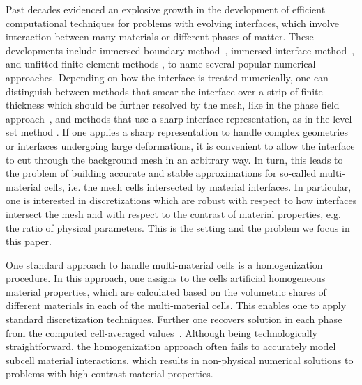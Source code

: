 \documentclass[12pt]{article}
\begin{document}
	Past decades evidenced an explosive {\color{blue}growth in the development of efficient computational techniques} for problems with evolving interfaces, which involve interaction between many materials or different phases of matter. These developments include immersed boundary method~\cite{peskin2002immersed}, immersed interface method~\cite{leveque1994immersed}, and unfitted finite element methods \cite{belytschko2009review,burman2015cutfem}, to name several popular numerical approaches. Depending on how the interface is treated numerically, one can distinguish between methods that smear the interface over a strip of finite thickness which should be further resolved by the mesh, like in the phase field approach~\cite{steinbach2009phase}, and methods that use a sharp interface representation, as in the level-set method \cite{sethian1999level}.  If one applies a sharp representation to handle complex geometries or interfaces undergoing large deformations, it is convenient to allow the  interface to cut through the background mesh in an arbitrary way. In turn, this leads to the problem of building accurate and stable approximations for  so-called multi-material cells, i.e. the mesh cells intersected by material interfaces. In particular, one is interested in discretizations which are robust with respect to how interfaces intersect the mesh and with respect to the contrast of  material properties, e.g. the ratio of physical parameters. This is the setting and the problem  we focus in this paper.

	
One standard approach to handle  multi-material cells is a homogenization procedure. In this approach, one assigns to the cells  artificial homogeneous  material properties, which are calculated based on the volumetric shares of different materials in each of the multi-material cells. This enables one to apply standard discretization {techniques}. %
Further one recovers solution in each phase from the computed cell-averaged values~\cite{dawes2013solving}.
Although being technologically straightforward, the homogenization approach often fails  to accurately model subcell material interactions, which results in non-physical numerical solutions to problems with high-contrast material properties.
\end{document}
